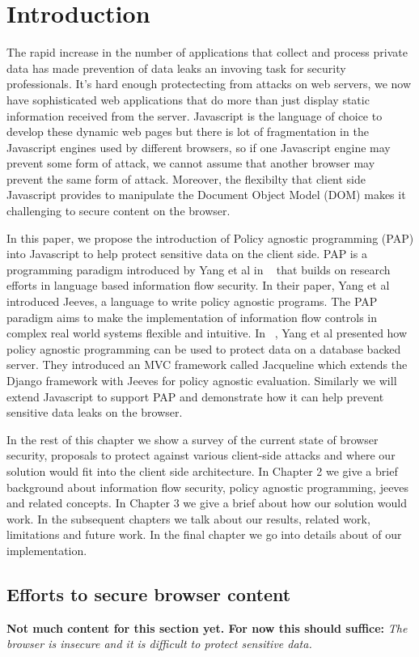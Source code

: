 \chapter{Introduction\label{chap:intro}}

The rapid increase in the number of applications that collect and process private
data has made prevention of data leaks an invoving task for security professionals.
It's hard enough protectecting from attacks on web servers, we now have sophisticated
web applications that do more than just display static information received from
the server. Javascript is the language of choice to develop these dynamic web pages
but there is lot of fragmentation in the Javascript engines used by different browsers,
so if one Javascript engine may prevent some form of attack, we cannot assume
that another browser may prevent the same form of attack. Moreover, the flexibilty
that client side Javascript provides to manipulate the Document Object Model (DOM)
makes it challenging to secure content on the browser.

In this paper, we propose the introduction of Policy agnostic programming (PAP)
into Javascript to help protect sensitive data on the client side. PAP is a
programming paradigm introduced by Yang et al in ~\cite{Jeeves} that builds on
research efforts in language based information flow security. In their paper,
Yang et al introduced Jeeves, a language to write policy agnostic programs. The
PAP paradigm aims to make the implementation of information flow controls in complex
real world systems flexible and intuitive. In ~\cite{Jacqueline}, Yang et al
presented how policy agnostic programming can be used to protect data on a database
backed server. They introduced an MVC framework called Jacqueline which extends
the Django framework with Jeeves for policy agnostic evaluation. Similarly we will
extend Javascript to support PAP and demonstrate how it can help prevent sensitive
data leaks on the browser.

In the rest of this chapter we show a survey of the current state of browser security,
proposals to protect against various client-side attacks and where our solution
would fit into the client side architecture. In Chapter 2 we give a brief background
about information flow security, policy agnostic programming, jeeves and related
concepts. In Chapter 3 we give a brief about how our solution would work. In the
subsequent chapters we talk about our results, related work, limitations and future
work. In the final chapter we go into details about of our implementation.

\section{Efforts to secure browser content}
\textbf{Not much content for this section yet. For now this should suffice:}
\textit{The browser is insecure and it is difficult to protect sensitive data.}
